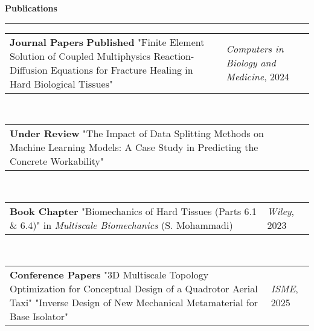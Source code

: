 \documentclass[11pt]{article}
\newlength{\sectionspace}
\newenvironment{rSection}[1]{
    \vspace{0.8em}
    {\large\bfseries\color{sectiongray} #1}
    \vspace{0.2em}
    \hrule height 0.2pt
    \vspace{0.5em}
}{
    \vspace{0.3em}
}
\begin{document}
\begin{rSection}{Publications}
\begin{tabular}{@{}p{}@{}p{}@{}}
    \color{accentblue}\textbf{Journal Papers} \newline
    \textbf{Published} \newline
    "Finite Element Solution of Coupled Multiphysics Reaction-Diffusion Equations for Fracture Healing in Hard Biological Tissues" &
    \raggedleft \textit{Computers in Biology and Medicine}, 2024 \\
\end{tabular} \\
\vspace{\sectionspace}

\begin{tabular}{@{}p{}@{}p{}@{}}
    \textbf{Under Review} \newline
    "The Impact of Data Splitting Methods on Machine Learning Models: A Case Study in Predicting the Concrete Workability" &
    \raggedleft 2025 \\
\end{tabular} \\
\vspace{\sectionspace}

\begin{tabular}{@{}p{}@{}p{}@{}}
    \color{accentblue}\textbf{Book Chapter} \newline
    "Biomechanics of Hard Tissues (Parts 6.1 \& 6.4)" in \textit{Multiscale Biomechanics} (S. Mohammadi) &
    \raggedleft \textit{Wiley}, 2023 \\
\end{tabular} \\
\vspace{\sectionspace}

\begin{tabular}{@{}p{}@{}p{}@{}}
    \color{accentblue}\textbf{Conference Papers} \newline
    "3D Multiscale Topology Optimization for Conceptual Design of a Quadrotor Aerial Taxi" \newline
    "Inverse Design of New Mechanical Metamaterial for Base Isolator" &
    \raggedleft \textit{ISME}, 2025 \\
\end{tabular}
\end{rSection}
\end{document}
